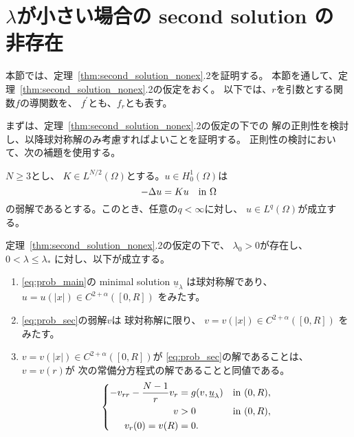 \section{$\lambda$が小さい場合の second solution の非存在}
\label{sec:sym}

本節では、定理~\ref{thm:second_solution_nonex}.2を証明する。
本節を通して、定理~\ref{thm:second_solution_nonex}.2の仮定をおく。
以下では、$r$を引数とする関数$f$の導関数を、
$f^\prime$とも、$f_r$とも表す。

まずは、定理~\ref{thm:second_solution_nonex}.2の仮定の下での
解の正則性を検討し、以降球対称解のみ考慮すればよいことを証明する。
正則性の検討において、次の補題を使用する。

\begin{lem} 
 \label{lem:regularity}
 $N \geq 3$とし、
 $K \in L^{N/2}(\Omega)$とする。$u \in H_0^1(\Omega)$は
 \[
  - \Delta u = K u \ \ ~\text{in}~ \Omega
 \]
 の弱解であるとする。このとき、任意の$q < \infty$に対し、
 $u \in L^q(\Omega)$が成立する。
\end{lem}

\begin{lem} \label{lem:reg_rad}
 定理~\ref{thm:second_solution_nonex}.2の仮定の下で、
 $\lambda_0 > 0$が存在し、$0 < \lambda \leq \lambda_*$
 に対し、以下が成立する。
 \begin{enumerate}[1.] \sage
  \item \ref{eq:prob_main}の minimal solution $\underline{u}_\lambda$
        は球対称解であり、
        $u = u(\lvert x \rvert)
        \in C^{2+\alpha}([0, R])$
        をみたす。
  \item \ref{eq:prob_sec}の弱解$v$は
        球対称解に限り、
        $v = v(\lvert x \rvert)
        \in C^{2+\alpha}([0, R])$
        をみたす。
  \item $v = v(\lvert x \rvert) \in C^{2+\alpha}([0, R])$が
        \ref{eq:prob_sec}の解であることは、
        $v = v(r)$が
        次の常備分方程式の解であることと同値である。
        \begin{align}
         \left\{
          \begin{aligned}
           -v_{rr} - \frac{N-1}{r}v_r  &= g(v, \underline{u}_\lambda)
           & &\text{in}~ (0, R),  \\
           v &> 0 & &\text{in}~ (0, R), \\
           v_r(0) = v(R) &= 0.  & &
          \end{aligned}
         \right. \label{eq:prob_rad}
        \end{align}
 \end{enumerate}
\end{lem}

